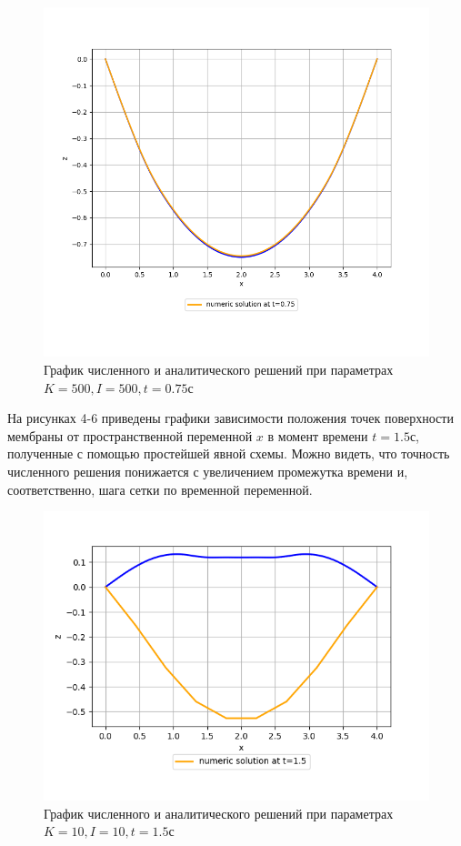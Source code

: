 {{\begin{figure}[H]
\begin{center}
			\includegraphics[width=0.6\pagewidth, height=0.33\pageheight]{plots/075_500_500}
	\caption{График численного и аналитического решений при параметрах $K=500, I=500, t = 0.75с$}
	 \end{center}
	\label{some_pic}
\end{figure}

		 
	На рисунках 4-6 приведены графики зависимости положения точек поверхности мембраны от пространственной переменной $x$ в момент времени $t = 1.5с$, полученные с помощью простейшей явной схемы. Можно видеть, что точность численного решения понижается с увеличением промежутка времени и, соответственно, шага сетки по временной переменной.
	
	\begin{figure}[H]
		\begin{center}
			\includegraphics[width=0.58\pagewidth, height=0.3\pageheight]{plots/15_10_10}
			\caption{График численного и аналитического решений при параметрах $K=10, I=10, t = 1.5с$}
		\end{center}
		\label{some_pic}
	\end{figure}
	
}}
